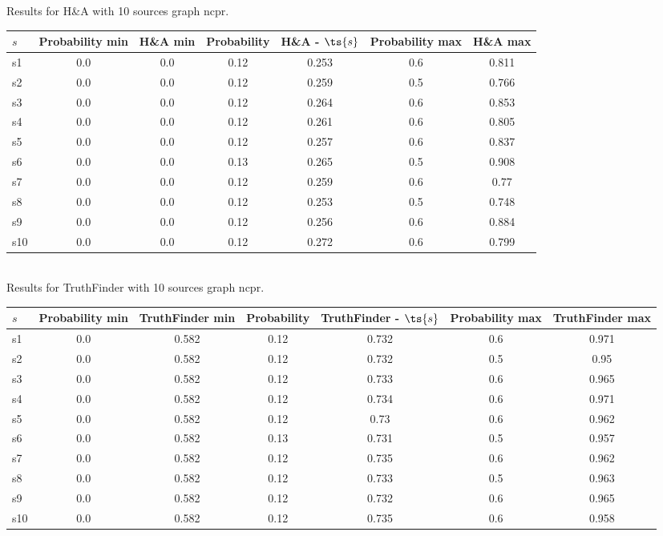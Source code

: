 \documentclass{article}
\begin{document}
\noindent Results for H\&A with 10 sources graph ncpr.

\noindent\begin{tabular}{|l|c|c|c|c|c|c|}
\hline
$s$& Probability min & H\&A min & Probability & H\&A - $\ts{s}$ & Probability max & H\&A max\\
\hline
s1 &0.0 & 0.0 & 0.12 & 0.253 & 0.6 & 0.811\\
\hline
s2 &0.0 & 0.0 & 0.12 & 0.259 & 0.5 & 0.766\\
\hline
s3 &0.0 & 0.0 & 0.12 & 0.264 & 0.6 & 0.853\\
\hline
s4 &0.0 & 0.0 & 0.12 & 0.261 & 0.6 & 0.805\\
\hline
s5 &0.0 & 0.0 & 0.12 & 0.257 & 0.6 & 0.837\\
\hline
s6 &0.0 & 0.0 & 0.13 & 0.265 & 0.5 & 0.908\\
\hline
s7 &0.0 & 0.0 & 0.12 & 0.259 & 0.6 & 0.77\\
\hline
s8 &0.0 & 0.0 & 0.12 & 0.253 & 0.5 & 0.748\\
\hline
s9 &0.0 & 0.0 & 0.12 & 0.256 & 0.6 & 0.884\\
\hline
s10 &0.0 & 0.0 & 0.12 & 0.272 & 0.6 & 0.799\\
\hline
\end{tabular}\\

\noindent Results for TruthFinder with 10 sources graph ncpr.

\noindent\begin{tabular}{|l|c|c|c|c|c|c|}
\hline
$s$& Probability min & TruthFinder min & Probability & TruthFinder - $\ts{s}$ & Probability max & TruthFinder max\\
\hline
s1 &0.0 & 0.582 & 0.12 & 0.732 & 0.6 & 0.971\\
\hline
s2 &0.0 & 0.582 & 0.12 & 0.732 & 0.5 & 0.95\\
\hline
s3 &0.0 & 0.582 & 0.12 & 0.733 & 0.6 & 0.965\\
\hline
s4 &0.0 & 0.582 & 0.12 & 0.734 & 0.6 & 0.971\\
\hline
s5 &0.0 & 0.582 & 0.12 & 0.73 & 0.6 & 0.962\\
\hline
s6 &0.0 & 0.582 & 0.13 & 0.731 & 0.5 & 0.957\\
\hline
s7 &0.0 & 0.582 & 0.12 & 0.735 & 0.6 & 0.962\\
\hline
s8 &0.0 & 0.582 & 0.12 & 0.733 & 0.5 & 0.963\\
\hline
s9 &0.0 & 0.582 & 0.12 & 0.732 & 0.6 & 0.965\\
\hline
s10 &0.0 & 0.582 & 0.12 & 0.735 & 0.6 & 0.958\\
\hline
\end{tabular}\\
\end{document}
